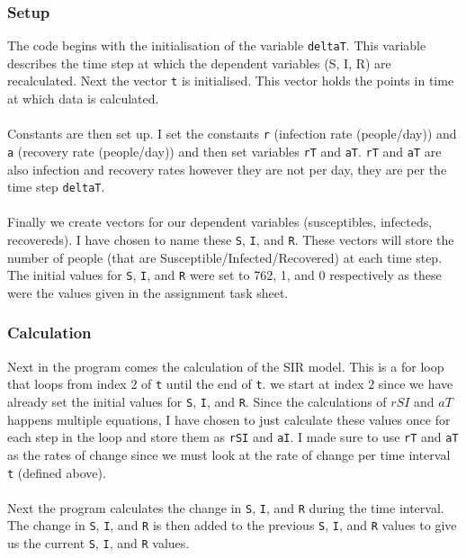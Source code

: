 \documentclass{article}
\begin{document}
        \subsubsection{Setup}
            The code begins with the initialisation of the variable \texttt{deltaT}. This variable describes the time step at which the dependent variables (S, I, R) are recalculated. Next the vector \texttt{t} is initialised. This vector holds the points in time at which data is calculated.
            \\
            \\
            Constants are then set up. I set the constants \texttt{r} (infection rate (people/day)) and \texttt{a} (recovery rate (people/day)) and then set variables \texttt{rT} and \texttt{aT}. \texttt{rT} and \texttt{aT} are also infection and recovery rates however they are not per day, they are per the time step \texttt{deltaT}.
            \\
            \\
            Finally we create vectors for our dependent variables (susceptibles, infecteds, recovereds). I have chosen to name these \texttt{S}, \texttt{I}, and \texttt{R}. These vectors will store the number of people (that are Susceptible/Infected/Recovered) at each time step. The initial values for \texttt{S}, \texttt{I}, and \texttt{R} were set to 762, 1, and 0 respectively as these were the values given in the assignment task sheet.
        
        \subsubsection{Calculation}
            Next in the program comes the calculation of the SIR model. This is a for loop that loops from index 2 of \texttt{t} until the end of \texttt{t}. we start at index 2 since we have already set the initial values for \texttt{S}, \texttt{I}, and \texttt{R}. Since the calculations of \(rSI\) and \(aT\) happens multiple equations, I have chosen to just calculate these values once for each step in the loop and store them as \texttt{rSI} and \texttt{aI}. I made sure to use \texttt{rT} and \texttt{aT} as the rates of change since we must look at the rate of change per time interval \texttt{t} (defined above).
            \\
            \\
            Next the program calculates the change in \texttt{S}, \texttt{I}, and \texttt{R} during the time interval. The change in \texttt{S}, \texttt{I}, and \texttt{R} is then added to the previous \texttt{S}, \texttt{I}, and \texttt{R} values to give us the current \texttt{S}, \texttt{I}, and \texttt{R} values.
\end{document}
